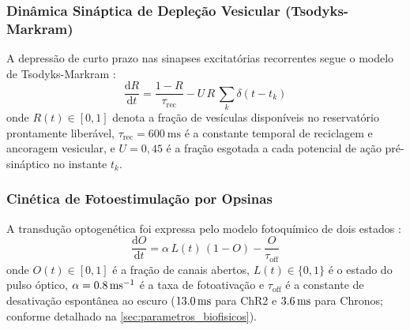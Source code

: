 \documentclass[11pt,a4paper,article,brazil]{abntex2}
\begin{document}
\subsubsection{Dinâmica Sináptica de Depleção Vesicular (Tsodyks-Markram)}
A depressão de curto prazo nas sinapses excitatórias recorrentes segue o modelo de Tsodyks-Markram \cite{tsodyks1998}:
\begin{equation}
    \frac{\mathrm{d}R}{\mathrm{d}t} = \frac{1 - R}{\tau_{\text{rec}}} - U\,R\,\sum_{k} \delta(t - t_k)
\end{equation}
onde $R(t) \in [0, 1]$ denota a fração de vesículas disponíveis no reservatório prontamente liberável, $\tau_{\text{rec}} = \qty{600}{\milli\second}$ é a constante temporal de reciclagem e ancoragem vesicular, e $U = 0{,}45$ é a fração esgotada a cada potencial de ação pré-sináptico no instante $t_k$.

\subsubsection{Cinética de Fotoestimulação por Opsinas}
A transdução optogenética foi expressa pelo modelo fotoquímico de dois estados \cite{nikolic2009, grossman2011}:
\begin{equation}
    \frac{\mathrm{d}O}{\mathrm{d}t} = \alpha\,L(t)\,(1 - O) - \frac{O}{\tau_{\text{off}}}
\end{equation}
onde $O(t) \in [0, 1]$ é a fração de canais abertos, $L(t) \in \{0, 1\}$ é o estado do pulso óptico, $\alpha = \qty{0{,}8}{\per\milli\second}$ é a taxa de fotoativação e $\tau_{\text{off}}$ é a constante de desativação espontânea ao escuro ($\qty{13{,}0}{\milli\second}$ para ChR2 e $\qty{3{,}6}{\milli\second}$ para Chronos; conforme detalhado na \cref{sec:parametros_biofisicos}).
\end{document}
